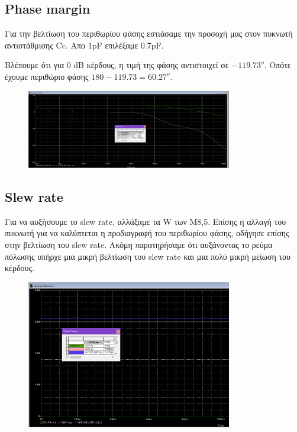 \documentclass[12pt, a4paper]{article}
\begin{document}
\subsection{Phase margin}

Για την βελτίωση του περιθωρίου φάσης εστιάσαμε την προσοχή μας στον πυκνωτή αντιστάθμισης Cc. Απο 1pF επιλέξαμε 0.7pF.

Βλέπουμε ότι για 0 dB κέρδους, η τιμή της φάσης αντιστοιχεί σε $-119.73^o$. Οπότε έχουμε περιθώριο φάσης $180 - 119.73 = 60.27^ο$.

\begin{figure}[h!]
	\centering
	\includegraphics[width = 0.8\textwidth, height = .3\textheight, keepaspectratio]{assets/phase_margin_tuned.png}
\end{figure}

\subsection{Slew rate}

Για να αυξήσουμε το slew rate, αλλάξαμε τα W των Μ8,5. Επίσης η αλλαγή του πυκνωτή για να καλύπτεται η προδιαγραφή του περιθωρίου φάσης, οδήγησε επίσης στην βελτίωση του slew rate. Ακόμη παρατηρήσαμε ότι αυξάνοντας το ρεύμα πόλωσης υπήρχε μια μικρή βελτίωση του slew rate και μια πολύ μικρή μείωση του κέρδους.

\begin{figure}[h!]
	\centering
	\includegraphics[width = 0.8\textwidth, height = .3\textheight, keepaspectratio]{assets/slew_rate_tuned.png}
\end{figure}
\end{document}
